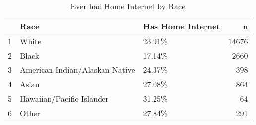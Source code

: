 \begin{table}[ht]
\centering
\begin{tabular}{rllr}
  \hline
 & Race & Has Home Internet & n \\ 
  \hline
1 & White & 23.91\% & 14676 \\ 
  2 & Black & 17.14\% & 2660 \\ 
  3 & American Indian/Alaskan Native & 24.37\% & 398 \\ 
  4 & Asian & 27.08\% & 864 \\ 
  5 & Hawaiian/Pacific Islander & 31.25\% &  64 \\ 
  6 & Other & 27.84\% & 291 \\ 
   \hline
\end{tabular}
\caption{Ever had Home Internet by Race} 
\end{table}
